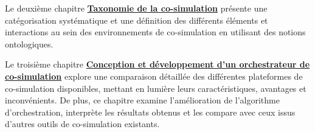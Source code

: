 Le deuxième chapitre \og \textbf{\hyperref[sec:tax]{Taxonomie de la co-simulation}
} \fg présente une catégorisation systématique et une définition des différents éléments et interactions au sein des environnements de co-simulation en utilisant des notions ontologiques.

Le troisième chapitre \og \textbf{\hyperref[sec:orc]{Conception et développement d'un orchestrateur de co-simulation}
} \fg  explore une comparaison détaillée des différentes plateformes de co-simulation disponibles, mettant en lumière leurs caractéristiques, avantages et inconvénients. De plus, ce chapitre examine l'amélioration de l'algorithme d'orchestration, interprète les résultats obtenus et les compare avec ceux issus d'autres outils de co-simulation existants.
\medskip


\clearpage